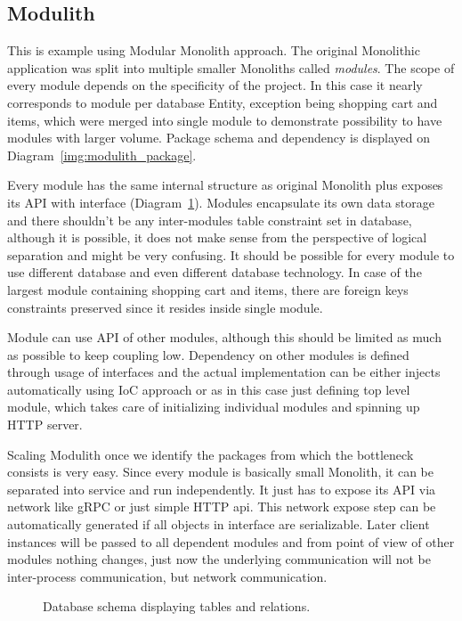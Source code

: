 \subsection{Modulith}
This is example using Modular Monolith approach. The original Monolithic application was split into multiple smaller Monoliths called \textit{modules}. The scope of every module depends on the specificity of the project. In this case it nearly corresponds to module per database Entity, exception being shopping cart and items, which were merged into single module to demonstrate possibility to have modules with larger volume. Package schema and dependency is displayed on Diagram~\ref{img:modulith_package}.

Every module has the same internal structure as original Monolith plus exposes its API with interface (Diagram~\ref{img:modulith_module_package}). Modules encapsulate its own data storage and there shouldn't be any inter-modules table constraint set in database, although it is possible, it does not make sense from the perspective of logical separation and might be very confusing. It should be possible for every module to use different database and even different database technology. In case of the largest module containing shopping cart and items, there are foreign keys constraints preserved since it resides inside single module.

Module can use API of other modules, although this should be limited as much as possible to keep coupling low. Dependency on other modules is defined through usage of interfaces and the actual implementation can be either injects automatically using IoC approach or as in this case just defining top level module, which takes care of initializing individual modules and spinning up HTTP server.

Scaling Modulith once we identify the packages from which the bottleneck consists is very easy. Since every module is basically small Monolith, it can be separated into service and run independently. It just has to expose its API via network like gRPC or just simple HTTP api. This network expose step can be automatically generated if all objects in interface are serializable. Later client instances will be passed to all dependent modules and from point of view of other modules nothing changes, just now the underlying communication will not be inter-process communication, but network communication.

\begin{figure}
    \centering
    
    \caption{Database schema displaying tables and relations. \label{img:modulith_module_package}}
\end{figure}

